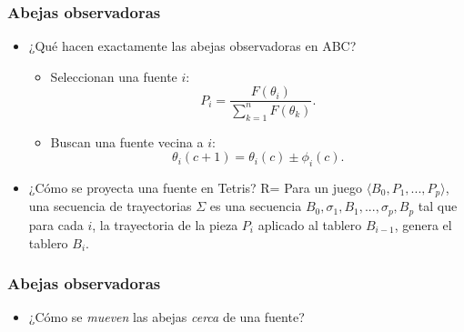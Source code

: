 \begin{frame}
\frametitle{Abejas observadoras}
\begin{itemize}
\item ¿Qué hacen exactamente las abejas observadoras en ABC? 
\begin{itemize}
\pause
\item Seleccionan una fuente $i$: 
\begin{displaymath}
  P_{i} = \frac{F(\theta_{i})}{\sum_{k=1}^{n} F(\theta_{k})}.
\end{displaymath}
\pause
\item Buscan una fuente vecina a $i$:
\begin{displaymath}
  \theta_{i}(c+1) = \theta_{i}(c) \pm \phi_{i}(c).
\end{displaymath}
\end{itemize}
\pause
\item ¿Cómo se proyecta una fuente en Tetris?
\pause
R= Para un juego $\langle B_{0}, P_{1}, ..., P_{p} \rangle$, una secuencia de
trayectorias $\Sigma$ es una secuencia $B_{0},\sigma_{1},B_{1},...,\sigma_{p},B_{p}$
tal que para cada $i$, la trayectoria de la pieza $P_{i}$ aplicado al tablero
$B_{i-1}$, genera el tablero $B_{i}$.
\end{itemize}
\end{frame}



\begin{frame}
\frametitle{Abejas observadoras}
\begin{itemize}
\item ¿Cómo se \textit{mueven} las abejas \textit{cerca} de una fuente?
\end{itemize}
\begin{figure}
\scalebox{.55}{}
\end{figure}
\end{frame}